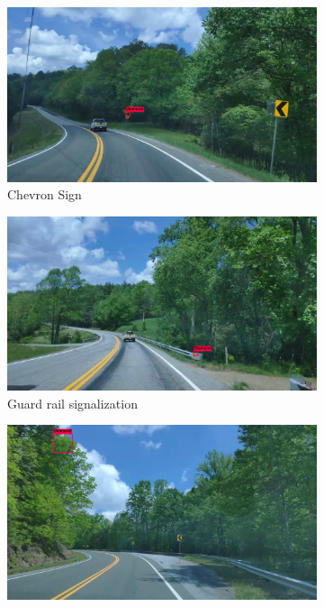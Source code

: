 \begin{figure}
  \begin{center}
    \begin{subfigure}[t]{.49\linewidth}
      \centering
      \includegraphics[width=0.99\linewidth]{figures/examples/sr2/FP/FP_13.png}
      \caption{Chevron Sign}
      \label{fig:chevronFP}
    \end{subfigure}
    \begin{subfigure}[t]{.49\linewidth}
      \centering
      \includegraphics[width=0.99\linewidth]{figures/examples/sr2/FP/FP_09.png}
      \caption{Guard rail signalization}
      \label{fig:guardRailFP}
    \end{subfigure}
    \begin{subfigure}[t]{.49\linewidth}
      \centering
      \includegraphics[width=0.99\linewidth]{figures/examples/sr2/FP/FP_04.png}

\end{subfigure}
\end{center}
\end{figure}
